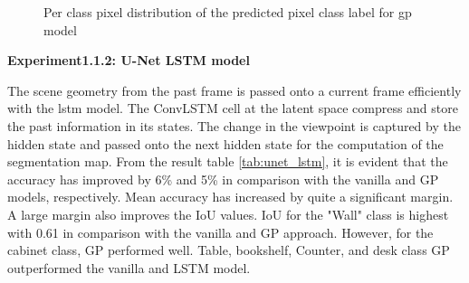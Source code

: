 	\begin{figure}%
		\centering
		\qquad
		\caption{Per class pixel distribution of the predicted pixel class label for gp model}%
		\label{fig:y_gt_and_predic_gp}%
	\end{figure}

    \newpage
	{ \bf Experiment1.1.2: U-Net LSTM model}
	
	The scene geometry from the past frame is passed onto a current frame efficiently with the lstm model. The ConvLSTM cell at the latent space compress and store the past information in its states. The change in the viewpoint is captured by the hidden state and passed onto the next hidden state for the computation of the segmentation map. From the result table \ref{tab:unet_lstm}, it is evident that the accuracy has improved by 6\% and 5\% in comparison with the vanilla and GP models, respectively. Mean accuracy has increased by quite a significant margin. A large margin also improves the IoU values. IoU for the "Wall" class is highest with 0.61 in comparison with the vanilla and GP approach. However, for the cabinet class, GP performed well. Table, bookshelf, Counter, and desk class GP outperformed the vanilla and LSTM model. 
	
